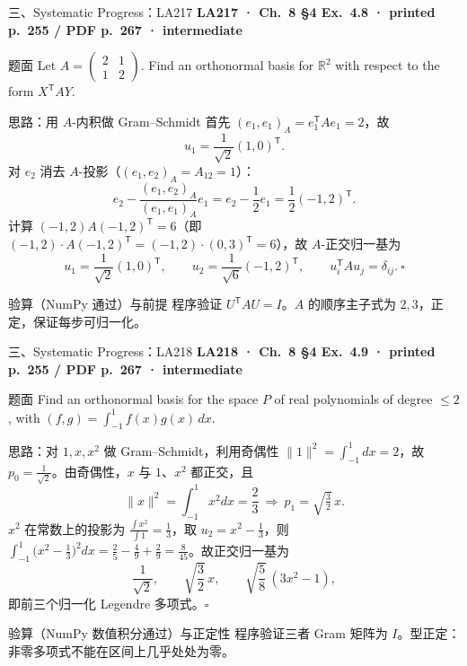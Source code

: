 \documentclass[aspectratio=169,10pt,fontset=none]{ctexbeamer}
\newcommand{\ex}[1]{\textcolor{accent}{\footnotesize\bfseries #1}}
\begin{document}
\begin{frame}[t]{三、Systematic Progress：LA217}
  \leavevmode\ex{LA217 · Ch.~8 §4 Ex.~4.8 · printed p.~255 / PDF p.~267 · intermediate}
  \begin{block}{\footnotesize 题面}
    \scriptsize Let $A=\begin{pmatrix}2&1\\1&2\end{pmatrix}$. Find an orthonormal basis for $\mathbb R^2$ with respect to the form $X^{\mathsf T}AY$.
  \end{block}
  \begin{exampleblock}{\footnotesize 思路：用 $A$-内积做 Gram--Schmidt}
    \scriptsize
    首先 $(e_1,e_1)_A=e_1^{\mathsf T}Ae_1=2$，故
    $$u_1=\frac1{\sqrt2}(1,0)^{\mathsf T}.$$
    对 $e_2$ 消去 $A$-投影（$(e_1,e_2)_A=A_{12}=1$）：
    $$e_2-\frac{(e_1,e_2)_A}{(e_1,e_1)_A}e_1=e_2-\frac12e_1=\frac12(-1,2)^{\mathsf T}.$$
    计算 $(-1,2)A(-1,2)^{\mathsf T}=6$（即 $(-1,2)\cdot A(-1,2)^{\mathsf T}=(-1,2)\cdot(0,3)^{\mathsf T}=6$），故 $A$-正交归一基为
    $$\boxed{u_1=\frac1{\sqrt2}(1,0)^{\mathsf T},\qquad u_2=\frac1{\sqrt6}(-1,2)^{\mathsf T}},\qquad u_i^{\mathsf T}Au_j=\delta_{ij}.\ \square$$
  \end{exampleblock}
  \begin{block}{\footnotesize 验算（NumPy 通过）与前提}
    \scriptsize 程序验证 $U^{\mathsf T}AU=I$。$A$ 的顺序主子式为 $2,3$，正定，保证每步可归一化。
  \end{block}
\end{frame}

\begin{frame}[t]{三、Systematic Progress：LA218}
  \leavevmode\ex{LA218 · Ch.~8 §4 Ex.~4.9 · printed p.~255 / PDF p.~267 · intermediate}
  \begin{block}{\footnotesize 题面}
    \scriptsize Find an orthonormal basis for the space $P$ of real polynomials of degree $\le2$, with $(f,g)=\int_{-1}^1f(x)g(x)\,dx$.
  \end{block}
  \begin{exampleblock}{\footnotesize 思路：对 $1,x,x^2$ 做 Gram--Schmidt，利用奇偶性}
    \scriptsize
    $\lVert1\rVert^2=\int_{-1}^1dx=2$，故 $p_0=\tfrac1{\sqrt2}$。由奇偶性，$x$ 与 $1$、$x^2$ 都正交，且
    $$\lVert x\rVert^2=\int_{-1}^1x^2dx=\frac23\ \Longrightarrow\ p_1=\sqrt{\tfrac32}\,x.$$
    $x^2$ 在常数上的投影为 $\tfrac{\int x^2}{\int1}=\tfrac13$，取 $u_2=x^2-\tfrac13$，则 $\int_{-1}^1\big(x^2-\tfrac13\big)^2dx=\tfrac25-\tfrac49+\tfrac29=\tfrac8{45}$。故正交归一基为
    $$\boxed{\frac1{\sqrt2},\qquad \sqrt{\frac32}\,x,\qquad \sqrt{\frac58}\,(3x^2-1)},$$
    即前三个归一化 Legendre 多项式。$\square$
  \end{exampleblock}
  \begin{block}{\footnotesize 验算（NumPy 数值积分通过）与正定性}
    \scriptsize 程序验证三者 Gram 矩阵为 $I$。型正定：非零多项式不能在区间上几乎处处为零。
  \end{block}
\end{frame}
\end{document}
